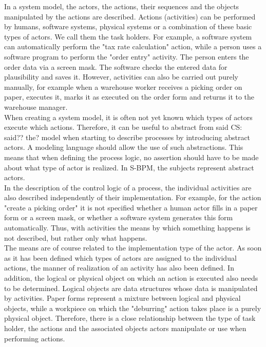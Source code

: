 In a system model, the actors, the actions, their sequences and the objects manipulated by the actions are described. Actions (activities) can be performed by humans, software systems, physical systems or a combination of these basic types of actors. We call them the task holders. For example, a software system can automatically perform the "tax rate calculation" action, while a person uses a software program to perform the "order entry" activity. The person enters the order data via a screen mask. The software checks the entered data for plausibility and saves it. However, activities can also be carried out purely manually, for example when a warehouse worker receives a picking order on paper, executes it, marks it as executed on the order form and returns it to the warehouse manager.\\
When creating a system model, it is often not yet known which types of actors execute which actions. Therefore, it can be useful to abstract from said CS: said?? the?  model when starting to describe processes by introducing abstract actors. A modeling language should allow the use of such abstractions. This means that when defining the process logic, no assertion should have to be made about what type of actor is realized. In S-BPM, the subjects represent abstract actors. \\
In the description of the control logic of a process, the individual activities are also described independently of their implementation. For example, for the action "create a picking order" it is not specified whether a human actor fills in a paper form or a screen mask, or whether a software system generates this form automatically. Thus, with activities the means by which something happens is not described, but rather only what happens.\\
The means are of course related to the implementation type of the actor. As soon as it has been defined which types of actors are assigned to the individual actions, the manner of realization of an activity has also been defined. In addition, the logical or physical object on which an action is executed also needs to be determined. Logical objects are data structures whose data is manipulated by activities. Paper forms represent a mixture between logical and physical objects, while a workpiece on which the "deburring" action takes place is a purely physical object. Therefore, there is a close relationship between the type of task holder, the actions and the associated objects actors manipulate or use when performing actions.\\
